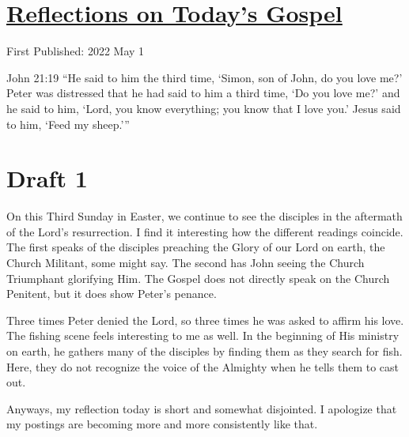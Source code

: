 \documentclass[12pt]{article}[titlepage]
\newcommand{\say}[1]{``#1''}
\newcommand{\nsay}[1]{`#1'}
\newcommand{\1}{\={a}}
\newcommand{\2}{\={e}}
\newcommand{\3}{\={\i}}
\newcommand{\4}{\=o}
\newcommand{\5}{\=u}
\newcommand{\6}{\={A}}
\renewcommand{\,}{\textsuperscript{,}}
\begin{document}
\doublespacing
\section{\href{reflections-on-readings-3-easter-c-2022.html}{Reflections on Today's Gospel}}
First Published: 2022 May 1

John 21:19 \say{He said to him the third time, \nsay{Simon, son of John, do you love me?} Peter was distressed that he had said to him a third time, \nsay{Do you love me?} and he said to him, \nsay{Lord, you know everything; you know that I love you.} Jesus said to him, \nsay{Feed my sheep.}}

\section{Draft 1}
On this Third Sunday in Easter, we continue to see the disciples in the aftermath of the Lord's resurrection.
I find it interesting how the different readings coincide.
The first speaks of the disciples preaching the Glory of our Lord on earth, the Church Militant, some might say.
The second has John seeing the Church Triumphant glorifying Him.
The Gospel does not directly speak on the Church Penitent, but it does show Peter's penance.

Three times Peter denied the Lord, so three times he was asked to affirm his love.
The fishing scene feels interesting to me as well.
In the beginning of His ministry on earth, he gathers many of the disciples by finding them as they search for fish.
Here, they do not recognize the voice of the Almighty when he tells them to cast out.

Anyways, my reflection today is short and somewhat disjointed.
I apologize that my postings are becoming more and more consistently like that.
\end{document}
